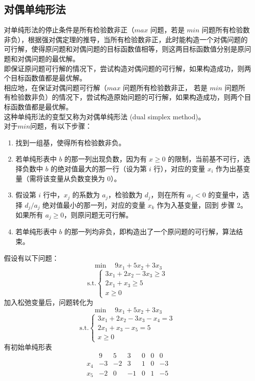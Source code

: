 \subsection{对偶单纯形法}
对单纯形法的停止条件是所有检验数非正（$max$ 问题，若是 $min$ 问题所有检验数非负），根据强对偶定理的推导，当所有检验数非正，此时能构造一个对偶问题的可行解，使得原问题和对偶问题的目标函数值相等，则这两目标函数值分别是原问题和对偶问题的最优解。\\ 
即保证原问题可行解的情况下，尝试构造对偶问题的可行解，如果构造成功，则两个目标函数值都是最优解。 \\
相应地，在保证对偶问题可行解（$max$ 问题所有检验数非正， 若是 $min$ 问题所有检验数非负）的情况下，尝试构造原始问题的可行解，如果构造成功，则两个目标函数值都是最优解。 \\
这种单纯形法的变型又称为对偶单纯形法 (dual simplex method)。 \\
对于$min$问题，有以下步骤：
\begin{enumerate}
    \item 找到一组基，使得所有检验数非负。
    \item 若单纯形表中 $b$ 的那一列出现负数，因为有 $x \ge 0$ 的限制，当前基不可行，选择负数中 $b$ 的绝对值最大的那一行（设为第 $i$ 行），对应的变量 $x_i$ 作为出基变量（需将该变量从负数变换为 0）。
    \item 假设第 $i$ 行中，$x_j$ 的系数为 $a_j$，检验数为 $d_j$，则在所有 $a_j < 0$ 的变量中，选择 $d_j/a_j$ 绝对值最小的那一列，对应的变量 $x_k$ 作为入基变量，回到 步骤 $2$。如果所有 $a_j \ge 0$，则原问题无可行解。
    \item 若单纯形表中 $b$ 的那一列均非负，即构造出了一个原问题的可行解，算法结束。
\end{enumerate}
假设有以下问题：
$$
\min \quad 9x_1 + 5x_2 + 3x_3
$$
$$
\text{s.t.} 
\begin{cases}
    3x_1 + 2x_2 - 3x_3 \ge 3 \\
    2x_1 + x_3 \ge 5 \\
    x \ge 0
\end{cases}
$$
加入松弛变量后，问题转化为
$$
\min \quad 9x_1 + 5x_2 + 3x_3
$$
$$
\text{s.t.} 
\begin{cases}
    3x_1 + 2x_2 - 3x_3 - x_4 = 3 \\
    2x_1 + x_3 - x_5 =  5 \\
    x \ge 0
\end{cases}
$$
有初始单纯形表
$$
\begin{array}{c|ccccc|c} & 9 & 5 & 3 & 0 & 0 & 0 \\ \hline x_4 & -3 & -2 & 3 & 1 & 0 & -3 \\ x_5 & -2 & 0 & -1 & 0 & 1 & -5 \end{array}
$$
